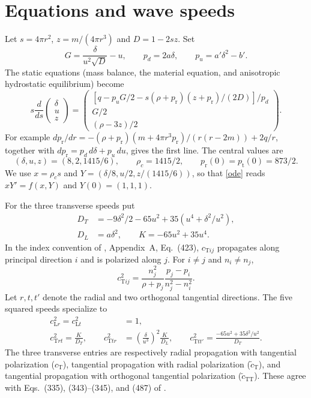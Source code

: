 \documentclass[11pt]{article}
\newcommand{\dd}{\delta}
\newcommand{\pr}{p_{\mathrm r}}
\newcommand{\pt}{p_{\mathrm t}}
\begin{document}
\section{Equations and wave speeds}
Let $s=4\pi r^2$, $z=m/(4\pi r^3)$ and $D=1-2sz$. Set
\[
 G=\frac{\dd}{u^2\sqrt D}-u,\qquad p_d=2a\dd,\qquad p_u=a'\dd^2-b'.
\]
The static equations (mass balance, the material equation, and anisotropic hydrostatic equilibrium) become
\begin{equation}\label{ode}
 s\frac{d}{ds}\begin{pmatrix}\dd\\u\\z\end{pmatrix}
 =\begin{pmatrix}
 [q-p_uG/2-s(\rho+\pr)(z+\pr)/(2D)]/p_d\\
 G/2\\(\rho-3z)/2
 \end{pmatrix}.
\end{equation}
For example $d\pr/dr=-(\rho+\pr)(m+4\pi r^3\pr)/(r(r-2m))+2q/r$, together with $d\pr=p_d\,d\dd+p_u\,du$, gives the first line. The central values are
\[
 (\dd,u,z)=(8,2,1415/6),\qquad \rho_c=1415/2,
 \qquad \pr(0)=\pt(0)=873/2.
\]
We use $x=\rho_c s$ and $Y=(\dd/8,u/2,z/(1415/6))$, so that \eqref{ode} reads $xY'=f(x,Y)$ and $Y(0)=(1,1,1)$.

For the three transverse speeds put
\begin{align*}
 D_T&=-9\dd^2/2-65u^2+35(u^4+\dd^2/u^2),\\
 D_L&=a\dd^2,\qquad K=-65u^2+35u^4.
\end{align*}
In the index convention of \cite{ANPR24}, Appendix~A, Eq.~(423), $c_{\mathrm T ij}$ propagates along principal direction $i$ and is polarized along $j$. For $i\ne j$ and $n_i\ne n_j$,
\begin{equation}\label{generalwave}
 c_{\mathrm T ij}^2=\frac{n_j^2}{\rho+p_j}
              \frac{p_j-p_i}{n_j^2-n_i^2}.
\end{equation}
Let $r,t,t'$ denote the radial and two orthogonal tangential directions. The five squared speeds specialize to
\begin{align}\label{waves}
 c_{\mathrm L r}^2=c_{\mathrm L t}^2&=1,\nonumber\\
 c_{\mathrm T rt}^2=\frac K{D_T},\qquad
 c_{\mathrm T tr}^2&=\left(\frac{\dd}{u^3}\right)^2\frac K{D_L},\qquad
 c_{\mathrm T tt'}^2=\frac{-65u^2+35\dd^2/u^2}{D_T}.
\end{align}
The three transverse entries are respectively radial propagation with tangential polarization ($c_{\mathrm T}$), tangential propagation with radial polarization ($\tilde c_{\mathrm T}$), and tangential propagation with orthogonal tangential polarization ($\tilde c_{\mathrm{TT}}$). These agree with Eqs.~(335), (343)--(345), and (487) of \cite{ANPR24}.
\end{document}
